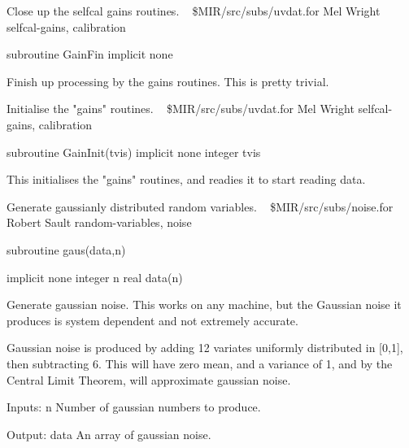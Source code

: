 \noindent Close up the selfcal gains routines.
\newline \ 
\newline {} \$MIR/src/subs/uvdat.for
\newline {} Mel Wright
\newline {} selfcal-gains, calibration
\par{\tenpoint
{\eightpoint\begintt
        subroutine GainFin
        implicit none

  Finish up processing by the gains routines. This is pretty trivial.
\endtt}
\par}
%
\noindent Initialise the "gains" routines.
\newline \ 
\newline {} \$MIR/src/subs/uvdat.for
\newline {} Mel Wright
\newline \abox{Keywords:} selfcal-gains, calibration
\par{\tenpoint
{\eightpoint\begintt
        subroutine GainInit(tvis)
        implicit none
        integer tvis

  This initialises the "gains" routines, and readies it to start reading
  data.
\endtt}
\par}
%
\noindent Generate gaussianly distributed random variables.
\newline \ 
\newline {} \$MIR/src/subs/noise.for
\newline \abox{Responsible:} Robert Sault
\newline {} random-variables, noise
\par{\tenpoint
{\eightpoint\begintt
        subroutine gaus(data,n)

        implicit none
        integer n
        real data(n)

  Generate gaussian noise. This works on any machine, but the Gaussian
  noise it produces is system dependent and not extremely accurate.

  Gaussian noise is produced by adding 12 variates uniformly distributed
  in [0,1], then subtracting 6. This will have zero
  mean, and a variance of 1, and by the Central Limit Theorem, will
  approximate gaussian noise.

  Inputs:
    n          Number of gaussian numbers to produce.

  Output:
    data       An array of gaussian noise.
\endtt}
\par}
